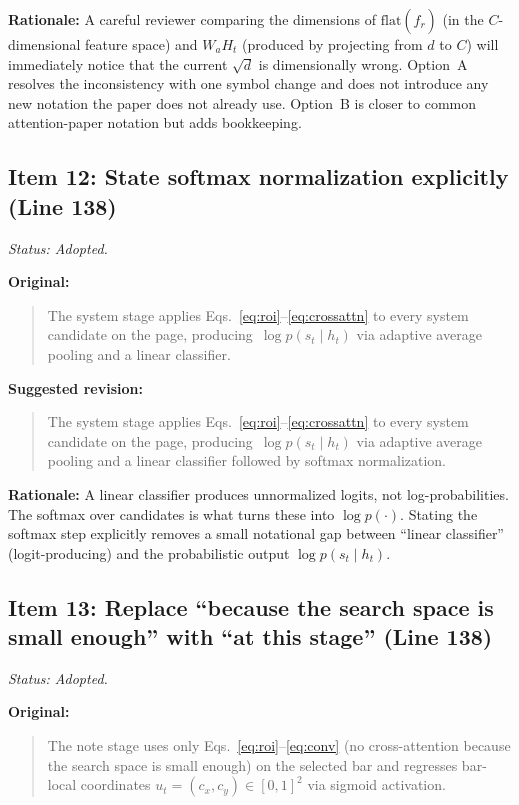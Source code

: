 \documentclass{article}
\begin{document}
\textbf{Rationale:}
A careful reviewer comparing the dimensions of $\mathrm{flat}(\hat{f}_r)$ (in the $C$-dimensional feature space) and $W_a H_t$ (produced by projecting from $d$ to $C$) will immediately notice that the current $\sqrt{d}$ is dimensionally wrong. Option~A resolves the inconsistency with one symbol change and does not introduce any new notation the paper does not already use. Option~B is closer to common attention-paper notation but adds bookkeeping.

\subsection*{Item 12: State softmax normalization explicitly (Line 138)}

\textit{Status: Adopted.}

\textbf{Original:}
\begin{quote}
The system stage applies Eqs.~\ref{eq:roi}--\ref{eq:crossattn} to every system candidate on the page, producing~$\log p(s_t \mid h_t)$ via adaptive average pooling and a linear classifier.
\end{quote}

\textbf{Suggested revision:}
\begin{quote}
The system stage applies Eqs.~\ref{eq:roi}--\ref{eq:crossattn} to every system candidate on the page, producing~$\log p(s_t \mid h_t)$ via adaptive average pooling and a linear classifier followed by softmax normalization.
\end{quote}

\textbf{Rationale:}
A linear classifier produces unnormalized logits, not log-probabilities. The softmax over candidates is what turns these into $\log p(\cdot)$. Stating the softmax step explicitly removes a small notational gap between ``linear classifier'' (logit-producing) and the probabilistic output $\log p(s_t \mid h_t)$.

\subsection*{Item 13: Replace ``because the search space is small enough'' with ``at this stage'' (Line 138)}

\textit{Status: Adopted.}

\textbf{Original:}
\begin{quote}
The note stage uses only Eqs.~\ref{eq:roi}--\ref{eq:conv} (no cross-attention because the search space is small enough) on the selected bar and regresses bar-local coordinates $u_t = (c_x, c_y) \in [0,1]^2$ via sigmoid activation.
\end{quote}
\end{document}
